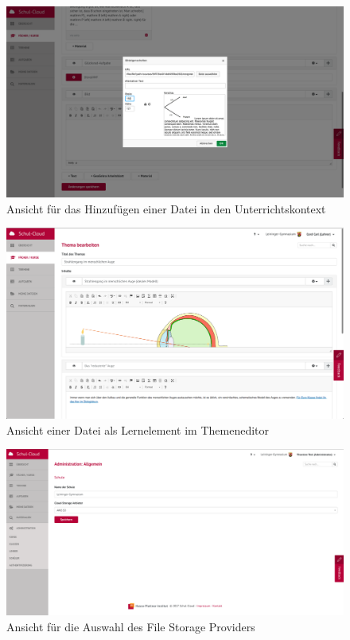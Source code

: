 \begin{figure}[H]
	\centering
	\includegraphics[width=1\linewidth]{images/screenCkEditor}
	\caption{Ansicht für das Hinzufügen einer Datei in den Unterrichtskontext}
	\label{fig:screenCkEditor}
\end{figure}

\begin{figure}[H]
	\centering
	\includegraphics[width=1\linewidth]{images/editor_picture}
	\caption{Ansicht einer Datei als Lernelement im Themeneditor}
	\label{fig:screenTopicEditor}
\end{figure}

\begin{figure}[H]
	\centering
	\includegraphics[width=1\linewidth]{images/adminFileStorage}
	\caption{Ansicht für die Auswahl des File Storage Providers}
	\label{fig:adminFileStorage}
\end{figure}

